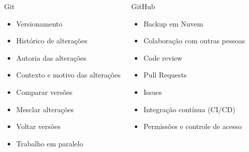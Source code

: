 \begin{frame}
  \begin{columns}[T]
    \begin{block}{Git}
      \begin{itemize}
        \item Versionamento
        \item Histórico de alterações
        \item Autoria das alterações
        \item Contexto e motivo das alterações
        \item Comparar versões
        \item Mesclar alterações
        \item Voltar versões
        \item Trabalho em paralelo
      \end{itemize}
    \end{block}
    \begin{block}{GitHub}
      \begin{itemize}
        \item Backup em Nuvem
        \item Colaboração com outras pessoas
        \item Code review
        \item Pull Requests
        \item Issues
        \item Integração contínua (CI/CD)
        \item Permissões e controle de acesso
      \end{itemize}
    \end{block}
  \end{columns}
\end{frame}
